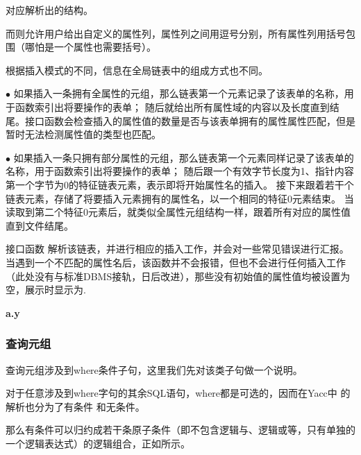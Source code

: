 \documentclass{article}
\begin{document}
\begin{spacing}{2}
            对应解析出的结构。

            而则允许用户给出自定义的属性列，属性列之间用逗号分别，所有属性列用括号包围（哪怕是一个属性也需要括号）。

            根据插入模式的不同，信息在全局链表中的组成方式也不同。

            \indent \indent $\bullet$ 如果插入一条拥有全属性的元组，那么链表第一个元素记录了该表单的名称，用于函数索引出将要操作的表单；
            随后就给出所有属性域的内容以及长度直到结尾。接口函数会检查插入的属性值的数量是否与该表单拥有的属性属性匹配，但是暂时无法检测属性值的类型也匹配。
            
            \indent \indent $\bullet$ 如果插入一条只拥有部分属性的元组，那么链表第一个元素同样记录了该表单的名称，用于函数索引出将要操作的表单；
            随后跟一个有效字节长度为1、指针内容第一个字节为0的特征链表元素，表示即将开始属性名的插入。
            接下来跟着若干个链表元素，存储了将要插入元素拥有的属性名，以一个相同的特征0元素结束。
            当读取到第二个特征0元素后，就类似全属性元组结构一样，跟着所有对应的属性值直到文件结尾。

            接口函数 解析该链表，并进行相应的插入工作，并会对一些常见错误进行汇报。当遇到一个不匹配的属性名后，该函数并不会报错，但也不会进行任何插入工作（此处没有与标准DBMS接轨，日后改进），那些没有初始值的属性值均被设置为空，展示时显示为.

            \textbf{a.y}
            \begin{spacing}{1.15}
            
            \end{spacing}
        \subsubsection{查询元组}
            查询元组涉及到where条件子句，这里我们先对该类子句做一个说明。
            
            对于任意涉及到where字句的其余SQL语句，where都是可选的，因而在Yacc中 的解析也分为了有条件 和无条件。

            那么有条件可以归约成若干条原子条件（即不包含逻辑与、逻辑或等，只有单独的一个逻辑表达式）的逻辑组合，正如所示。


\end{spacing}
\end{document}
